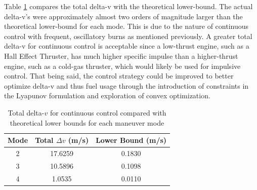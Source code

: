Table \ref{tab:dv_comparison_continuous} compares the total delta-v with the theoretical lower-bound. The actual delta-v's were approximately almost two orders of magnitude larger than the theoretical lower-bound for each mode. This is due to the nature of continuous control with frequent, oscillatory burns as mentioned previously. A greater total delta-v for continuous control is acceptable since a low-thrust engine, such as a Hall Effect Thruster, has much higher specific impulse than a higher-thrust engine, such as a cold-gas thruster, which would likely be used for impulsive control. That being said, the control strategy could be improved to better optimize delta-v and thus fuel usage through the introduction of constraints in the Lyapunov formulation and exploration of convex optimization. 
\begin{table}[H]
\centering
\begin{tabular}{|c|c|c|}
\hline
\textbf{Mode} & \textbf{Total }$\Delta v$ \textbf{(m/s)} & \textbf{Lower Bound (m/s)} \\
\hline
2 & 17.6259 & 0.1830 \\
3 & 10.5896 & 0.1098 \\
4 & 1.0535 & 0.0110 \\
\hline
\end{tabular}
\caption{Total delta-$v$ for continuous control compared with theoretical lower bounds for each maneuver mode}
\label{tab:dv_comparison_continuous}
\end{table}
